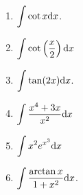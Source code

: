 \begin{multicols}{3}
\begin{enumerate}[ref={\fcProblemRef}]
\item $\displaystyle\int \cot x {\normalfont \text{d}} x$.


\item $\displaystyle \int \cot \left(\frac{x}{2}\right) {\normalfont \text{d}} x$


\item $\displaystyle\int \tan (2x) {\normalfont \text{d}} x$.

\item ${\displaystyle \int \frac{x^4 + 3x}{x^2} {\normalfont \text{d}} x}$


\item ${\displaystyle \int x^2 e^{x^3} {\normalfont \text{d}} x}$

\item \label{problemIntArctan(x)/(1+x^2)dx} $\displaystyle\int \frac{\arctan x}{1+x^2} {\normalfont \text{d}} x$. 

\end{enumerate}
\end{multicols}